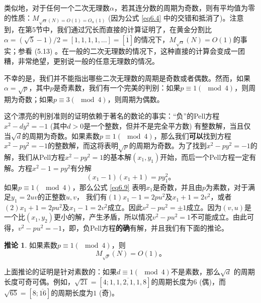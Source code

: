 \documentclass[11pt,a4paper]{article}
\theoremstyle{definition}
\newtheorem{corol}[prop]{\textbf{推论}}
\newcommand{\refeq}[1]{公式 \ref{#1}}
\numberwithin{equation}{section}
\newcommand{\juhao}{\text{。}}
\begin{document}
类似地，对于任何一个二次无理数$ \alpha $，若其连分数的周期为奇数，则有平均值为零的性质：$ M_{\sqrt{\alpha}\left(N\right)=O\left(1\right)=O_{\alpha}\left(1\right)} $  (因为\refeq{eq6.4} 中的交错和抵消了)。注意到，在第$ 5 $节中，我们通过冗长而直接的计算证明了，在黄金分割比
$ \alpha=(\sqrt{5}-1)/2=\left[1,1,1,1,\ldots\right]=\left[\overline{1}\right] $的情况下，$ M_{\sqrt{\alpha}}\left(N\right)=O\left(1\right) $的事实；参看 (5.13) 。在一般的二次无理数的情况下，这种直接的计算会变成一团糟，非常绝望，更别说一般的任意无理数的情况。
	
	不幸的是，我们并不能指出哪些二次无理数的周期是奇数或者偶数。然而，如果$ \alpha=\sqrt{p} $，其中$ p $是奇素数，我们有一个完美的判别：如果$ p\equiv1\left(\!\!\mod4\right) $，则周期为奇数；如果$ p\equiv3\left(\!\!\mod4\right) $，则周期为偶数。
	
	这个漂亮的判别准则的证明依赖于著名的数论的事实：``负''的Pell方程$ x^{2}-dy^{2}=-1 $ (其中$ d>0 $是一个整数，但并不是完全平方数) 有整数解，当且仅当$ \sqrt{d} $的周期为奇数。如果素数$ p\equiv1\left(\!\!\mod4\right) $，那么我们\textbf{可以}找到方程$ x^{2}-py^{2}=-1 $的整数解，而这将表明$ \sqrt{p} $的周期为奇数。为了找到$ x^{2}-py^{2}=-1 $的解，我们从Pell方程$ x^{2}-py^{2}=1 $的基本解$ \left(x_{1},y_{1}\right) $开始，而后一个Pell方程一定有解。方程$ x^{2}-1=py^{2} $有分解
	\begin{equation}\label{eq6.9}
		\left(x_{1}-1\right)\left(x_{1}+1\right)=py_{1}^{2}\juhao
	\end{equation}
	如果$ p\equiv1\left(\!\!\mod4\right) $，那么\refeq{eq6.9} 表明$ x_{1} $是奇数，并且由$ p $为素数，对于满足$ y_{1}=2uv $的正整数$ u,v $， 我们有$ \left(1\right) x_{1}-1=2pu^{2} \text{及} x_{1}+1=2v^{2}$，或者$ \left(2\right) x_{1}+1=2pu^{2}  \text{及} x_{1}-1=2v^{2}$成立。因此$ v^{2}-pu^{2}=\pm1 $成立。因为$\left(v,u\right)$是一个比$ \left(x_{1},y_{2}\right) $更小的解，产生矛盾，所以情况$ v^{2}-pu^{2}=1 $不可能成立。由此可得，$ v^{2}-pu^{2}=-1 $，即，负Pell方程\textbf{的确}有解，并且我们有下面的推论。
	
	\begin{corol}
		如果素数$ p\equiv1\left(\!\!\mod4\right) $，则
		\[  M_{\sqrt{p}}\left(N\right)=O\left(1\right) \juhao \]
	\end{corol}
	
    上面推论的证明是针对素数的：如果$ d\equiv1\left(\!\!\mod4\right) $不是素数，那么$ \sqrt{d} $ 的周期长度可奇可偶。例如，$ \sqrt{21}=\left[4;\overline{1,1,2,1,1,8}\right] $的周期长度为$ 6 $ (偶)，而$ \sqrt{65}=\left[8;\overline{16}\right] $的周期长度为$ 1 $ (奇)。
    
\end{document}
